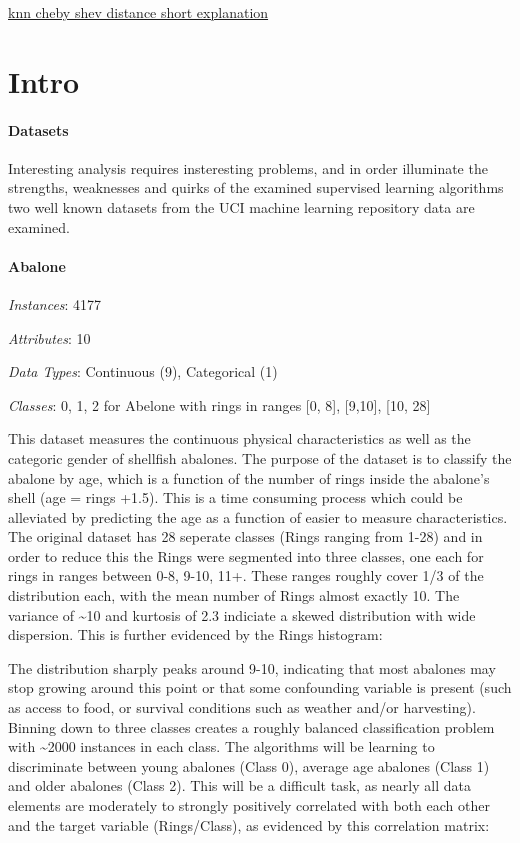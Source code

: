 \documentclass[11pt]{article}
\begin{document}
    \href{https://www.matec-conferences.org/articles/matecconf/pdf/2017/54/matecconf_iceesi2017_01024.pdf}{knn
cheby shev distance short explanation}

    \hypertarget{intro}{%
\section{Intro}\label{intro}}

\hypertarget{datasets}{%
\paragraph{Datasets}\label{datasets}}

Interesting analysis requires insteresting problems, and in order
illuminate the strengths, weaknesses and quirks of the examined
supervised learning algorithms two well known datasets from the UCI
machine learning repository data are examined.

    \hypertarget{abalone}{%
\paragraph{Abalone}\label{abalone}}

    \emph{Instances}: 4177

\emph{Attributes}: 10

\emph{Data Types}: Continuous (9), Categorical (1)

\emph{Classes}: 0, 1, 2 for Abelone with rings in ranges {[}0, 8{]},
{[}9,10{]}, {[}10, 28{]}

This dataset measures the continuous physical characteristics as well as
the categoric gender of shellfish abalones. The purpose of the dataset
is to classify the abalone by age, which is a function of the number of
rings inside the abalone's shell (age = rings +1.5). This is a time
consuming process which could be alleviated by predicting the age as a
function of easier to measure characteristics. The original dataset has
28 seperate classes (Rings ranging from 1-28) and in order to reduce
this the Rings were segmented into three classes, one each for rings in
ranges between 0-8, 9-10, 11+. These ranges roughly cover 1/3 of the
distribution each, with the mean number of Rings almost exactly 10. The
variance of \textasciitilde{}10 and kurtosis of 2.3 indiciate a skewed
distribution with wide dispersion. This is further evidenced by the
Rings histogram:

The distribution sharply peaks around 9-10, indicating that most
abalones may stop growing around this point or that some confounding
variable is present (such as access to food, or survival conditions such
as weather and/or harvesting). Binning down to three classes creates a
roughly balanced classification problem with \textasciitilde{}2000
instances in each class. The algorithms will be learning to discriminate
between young abalones (Class 0), average age abalones (Class 1) and
older abalones (Class 2). This will be a difficult task, as nearly all
data elements are moderately to strongly positively correlated with both
each other and the target variable (Rings/Class), as evidenced by this
correlation matrix:
\end{document}
